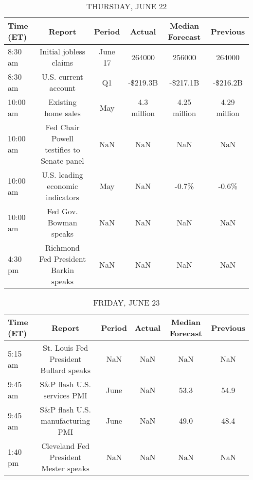 \documentclass{article}%
\begin{document}
%


\begin{table}[htbp]%
\caption{THURSDAY, JUNE 22}%
\centering%
\begin{adjustbox}{width=1\textwidth}%
\begin{tabular}{lccccc}
\toprule
Time (ET) &                                     Report &  Period &      Actual & Median Forecast &     Previous \\
\midrule
  8:30 am &                     Initial jobless claims & June 17 &      264000 &          256000 &       264000 \\
  8:30 am &                       U.S. current account &      Q1 &    -\$219.3B &        -\$217.1B &     -\$216.2B \\
 10:00 am &                        Existing home sales &     May & 4.3 million &    4.25 million & 4.29 million \\
 10:00 am & Fed Chair Powell testifies to Senate panel &     NaN &         NaN &             NaN &          NaN \\
 10:00 am &           U.S. leading economic indicators &     May &         NaN &           -0.7\% &        -0.6\% \\
 10:00 am &                     Fed Gov. Bowman speaks &     NaN &         NaN &             NaN &          NaN \\
  4:30 pm &       Richmond Fed President Barkin speaks &     NaN &         NaN &             NaN &          NaN \\
\bottomrule
\end{tabular}
%
\end{adjustbox}%
\end{table}

%


\begin{table}[htbp]%
\caption{FRIDAY, JUNE 23}%
\centering%
\begin{adjustbox}{width=1\textwidth}%
\begin{tabular}{lccccc}
\toprule
Time (ET) &                                 Report & Period & Actual & Median Forecast & Previous \\
\midrule
  5:15 am & St. Louis Fed President Bullard speaks &    NaN &    NaN &             NaN &      NaN \\
  9:45 am &            S\&P flash U.S. services PMI &   June &    NaN &            53.3 &     54.9 \\
  9:45 am &       S\&P flash U.S. manufacturing PMI &   June &    NaN &            49.0 &     48.4 \\
  1:40 pm &  Cleveland Fed President Mester speaks &    NaN &    NaN &             NaN &      NaN \\
\bottomrule
\end{tabular}
%
\end{adjustbox}%
\end{table}
\end{document}
